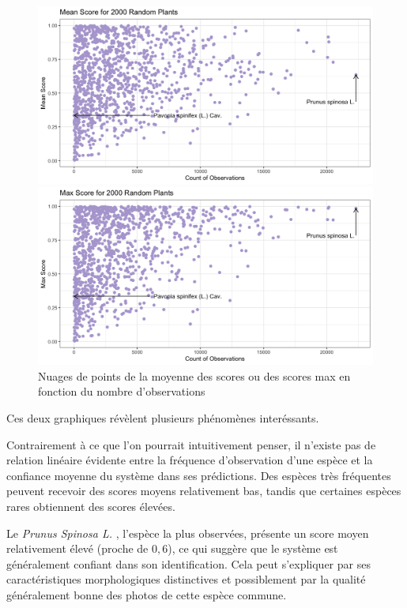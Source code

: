 \documentclass[a4paper,12pt]{article}
\begin{document}
\begin{figure}[H]
\centering
\begin{minipage}{0.5\textwidth}
  \includegraphics[width=0.8\linewidth]{images/mean_rd.png}
\end{minipage}%
\begin{minipage}{0.5\textwidth}
  \includegraphics[width=0.8\linewidth]{images/max_rd.png}
\end{minipage}
\caption{Nuages de points de la moyenne des scores ou des scores max en fonction du nombre d'observations}
\end{figure}


Ces deux graphiques révèlent plusieurs phénomènes interéssants.

Contrairement à ce que l'on pourrait intuitivement penser, il n'existe pas de relation linéaire évidente entre la fréquence d'observation d'une espèce et la confiance moyenne du système dans ses prédictions. Des espèces très fréquentes peuvent recevoir des scores moyens relativement bas, tandis que certaines espèces rares obtiennent des scores élevées.

\vspace{0.2cm}

Le \textit{Prunus Spinosa L.}
, l'espèce la plus observées, présente un score moyen relativement élevé (proche de $0,6$), ce qui suggère que le système est généralement confiant dans son identification. Cela peut s'expliquer par ses caractéristiques morphologiques distinctives et possiblement par la qualité généralement bonne des photos de cette espèce commune.
\end{document}
